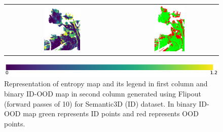 \begin{figure}[h!]
\begin{tabular}{cc}
            \includegraphics[width=0.33\textwidth, height=0.18\textheight]{images/ood_imgs/fout_sem3d/fout_ent_3.pdf}& 
            \includegraphics[width=0.33\textwidth, height=0.18\textheight]{images/ood_imgs/fout_sem3d/fout_ent_ood_auroc_3.pdf}\\
        \end{tabular}
        \includegraphics[scale=0.45]{images/ent_legend.pdf}
        \caption{Representation of entropy map and its legend in first column and binary ID-OOD map in second column generated using Flipout (forward passes of 10) for Semantic3D (ID) dataset. In binary ID-OOD map green represents ID points and red represents OOD points.}
        \label{fig:fout_ood_auroc_sem3d_ent}
    \end{figure}

